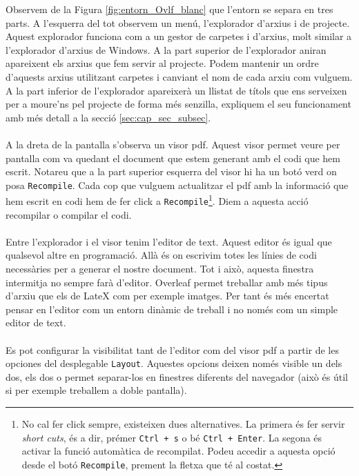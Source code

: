 \documentclass[12pm,oneside,onecolumn,openany]{book}
\newcounter{exemple}[chapter]
\begin{document}
\noindent Observem de la Figura \ref{fig:entorn_Ovlf_blanc} que l'entorn se separa en tres parts. A l'esquerra del tot observem un menú, l'explorador d'arxius i de projecte. Aquest explorador funciona com a un gestor de carpetes i d'arxius, molt similar a l'explorador d'arxius de Windows. A la part superior de l'explorador aniran apareixent els arxius que fem servir al projecte. Podem mantenir un ordre d'aquests arxius utilitzant carpetes i canviant el nom de cada arxiu com vulguem. A la part inferior de l'explorador apareixerà un llistat de títols que ens serveixen per a moure'ns pel projecte de forma més senzilla, expliquem el seu funcionament amb més detall a la secció \ref{sec:cap_sec_subsec}.\\\\
A la dreta de la pantalla s'observa un visor pdf. Aquest visor permet veure per pantalla com va quedant el document que estem generant amb el codi que hem escrit. Notareu que a la part superior esquerra del visor hi ha un botó verd on posa \texttt{Recompile}. Cada cop que vulguem actualitzar el pdf amb la informació que hem escrit en codi hem de fer click a \texttt{Recompile}\footnote{No cal fer click sempre, existeixen dues alternatives. La primera és fer servir \textit{short cuts}, és a dir, prémer \texttt{Ctrl + s} o bé \texttt{Ctrl + Enter}. La segona és activar la funció automàtica de recompilat. Podeu accedir a aquesta opció desde el botó \texttt{Recompile}, prement la fletxa que té al costat.}. Diem a aquesta acció recompilar o compilar el codi.\\\\
Entre l'explorador i el visor tenim l'editor de text. Aquest editor és igual que qualsevol altre en programació. Allà és on escrivim totes les línies de codi necessàries per a generar el nostre document. Tot i això, aquesta finestra intermitja no sempre farà d'editor. Overleaf permet treballar amb més tipus d'arxiu que els de LateX com per exemple imatges. Per tant és més encertat pensar en l'editor com un entorn dinàmic de treball i no només com un simple editor de text.\\\\
Es pot configurar la visibilitat tant de l'editor com del visor pdf a partir de les opciones del desplegable \texttt{Layout}. Aquestes opcions deixen només visible un dels dos, els dos o permet separar-los en finestres diferents del navegador (això és útil si per exemple treballem a doble pantalla).
\end{document}
